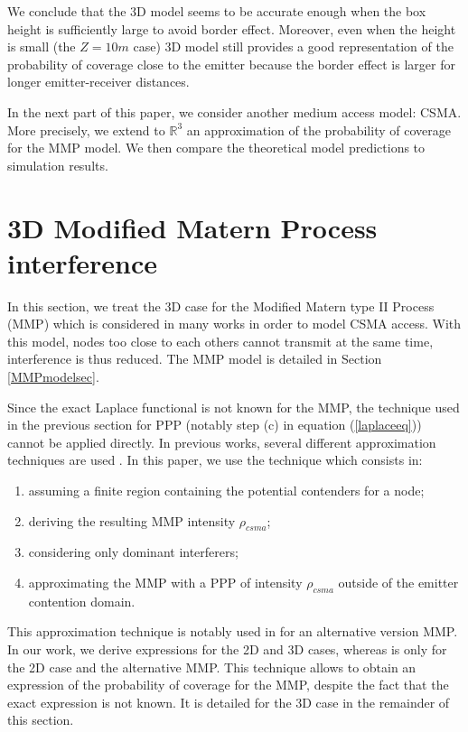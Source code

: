 \documentclass{sig-alternate-05-2015}
\begin{document}
We conclude that the 3D model seems to be accurate enough when the box height is sufficiently large to avoid border effect. Moreover, even when the height is small (the $Z=10m$ case) 3D model still provides a good representation of the probability of coverage close to the emitter because the border effect is larger for longer emitter-receiver distances.

In the next part of this paper, we consider another medium access model: CSMA. More precisely, we extend to $\mathbb{R}^3$ an approximation of the probability of coverage for the MMP model. We then compare the theoretical model predictions to simulation results.

\section{3D Modified Matern Process interference}
\label{MMPsec}

In this section, we treat the 3D case for the Modified Matern type II Process (MMP) which is considered in many works \cite{nguyen07,elsawy13} in order to model CSMA access. With this model, nodes too close to each others cannot transmit at the same time, interference is thus reduced. The MMP model is detailed in Section \ref{MMPmodelsec}.  

Since the exact Laplace functional is not known for the MMP, the technique used in the previous section for PPP (notably step (c) in equation (\ref{laplaceeq})) cannot be applied directly. In previous works, several different approximation techniques are used \cite{nguyen07,hasan07,kaynia11,elsawy13}. In this paper, we use the technique which consists in:
\begin{enumerate}
 \item assuming a finite region containing the potential contenders for a node;
 \item deriving the resulting MMP intensity $\rho_{csma}$;
 \item considering only dominant interferers;
 \item approximating the MMP with a PPP of intensity $\rho_{csma}$ outside of the emitter contention domain.
\end{enumerate}

This approximation technique is notably used in \cite{elsawy13} for an alternative version MMP. In our work, we derive expressions for the 2D and 3D cases, whereas \cite{elsawy13} is only for the 2D case and the alternative MMP. This technique allows to obtain an expression of the probability of coverage for the MMP, despite the fact that the exact expression is not known. It is detailed for the 3D case in the remainder of this section.
\end{document}
